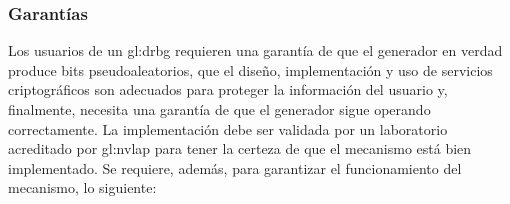 %
%
\subsubsection{Garantías}

Los usuarios de un \gls{gl:drbg} requieren una garantía de que el generador
en verdad produce bits pseudoaleatorios, que el diseño, implementación y uso
de servicios criptográficos son adecuados para proteger la información del
usuario y, finalmente, necesita una garantía de que el generador sigue
operando correctamente. La implementación debe ser validada por un laboratorio
acreditado por \gls{gl:nvlap} para tener la certeza de que el mecanismo está
bien implementado. Se requiere, además, para garantizar el funcionamiento del
mecanismo, lo siguiente:

